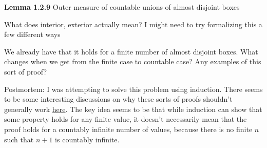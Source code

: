 \documentclass[answers,12pt]{exam}
\begin{document}
\textbf{Lemma 1.2.9} Outer measure of countable unions of almost disjoint boxes
\begin{solution}
What does interior, exterior actually mean?
I might need to try formalizing this a few different ways

We already have that it holds for a finite number of almost disjoint boxes.
What changes when we get from the finite case to countable case?
Any examples of this sort of proof?

Postmortem:
I was attempting to solve this problem using induction.
There seems to be some interesting discussions on why these sorts of proofs shouldn't generally work \href{https://math.stackexchange.com/questions/1872716/induction-countable-union-of-countable-sets}{here}.
The key idea seems to be that while induction can show that some property holds for any finite value, it doesn't necessarily mean that the proof holds for a countably infinite number of values, because there is no finite $n$ such that $n+1$ is countably infinite.
\end{solution}
\end{document}
